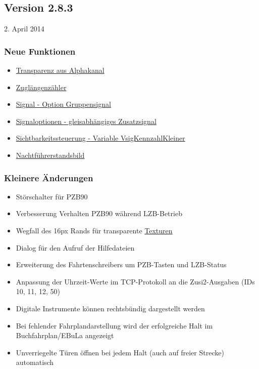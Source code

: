 \subsection{Version 2.8.3}\hfill 2. April 2014

\subsubsection{Neue Funktionen}
\begin{itemize}
\item \hyperref[sec:editor-obj-transparenz]{Transparenz aus Alphakanal}
\item \hyperref[sec.sim.steuerung.diverses.wegmessung]{Zuglängenzähler}
\item \hyperref[paragraph.editor.gleis.gleiseigenschaften.signal.optiongruppensignal] {Signal - Option Gruppensignal}
\item \hyperref[subsubsec.editor.gleis.gleiseigenschaften.signaloptionen]{Signaloptionen - gleisabhängiges Zusatzsignal}
\item \hyperref[sec.editor.obj.logischeausdruecke]{Sichtbarkeitssteuerung - Variable VsigKennzahlKleiner}
\item \hyperref[sect.editor.lok.fst]{Nachtführerstandsbild}
\end{itemize}

\subsubsection{Kleinere Änderungen}
\begin{itemize}
\item Störschalter für PZB90
\item Verbesserung Verhalten PZB90 während LZB-Betrieb
\item Wegfall des 16px Rands für transparente \hyperref[sec:editor-obj-textur]{Texturen}
\item Dialog für den Aufruf der Hilfedateien
\item Erweiterung des Fahrtenschreibers um PZB-Tasten und LZB-Status
\item Anpassung der Uhrzeit-Werte im TCP-Protokoll an die Zusi2-Ausgaben (IDs 10, 11, 12, 50)
\item Digitale Instrumente können rechtsbündig dargestellt werden
\item Bei fehlender Fahrplandarstellung wird der erfolgreiche Halt im Buchfahrplan/EBuLa angezeigt
\item Unverriegelte Türen öffnen bei jedem Halt (auch auf freier Strecke) automatisch 
\end{itemize}


